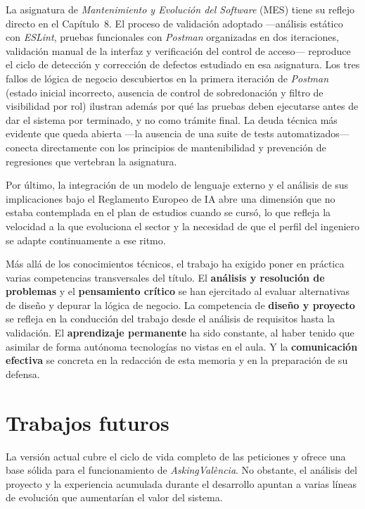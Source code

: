 \documentclass[11pt,oneside,spanish,listoffigures,listoftables]{tfgetsinf}
\begin{document}
La asignatura de \textit{Mantenimiento y Evolución del Software} (MES) tiene su reflejo directo en el Capítulo~8. El proceso de validación adoptado —análisis estático con \textit{ESLint}, pruebas funcionales con \textit{Postman} organizadas en dos iteraciones, validación manual de la interfaz y verificación del control de acceso— reproduce el ciclo de detección y corrección de defectos estudiado en esa asignatura. Los tres fallos de lógica de negocio descubiertos en la primera iteración de \textit{Postman} (estado inicial incorrecto, ausencia de control de sobredonación y filtro de visibilidad por rol) ilustran además por qué las pruebas deben ejecutarse antes de dar el sistema por terminado, y no como trámite final. La deuda técnica más evidente que queda abierta —la ausencia de una suite de tests automatizados— conecta directamente con los principios de mantenibilidad y prevención de regresiones que vertebran la asignatura.

Por último, la integración de un modelo de lenguaje externo y el análisis de sus implicaciones bajo el Reglamento Europeo de IA abre una dimensión que no estaba contemplada en el plan de estudios cuando se cursó, lo que refleja la velocidad a la que evoluciona el sector y la necesidad de que el perfil del ingeniero se adapte continuamente a ese ritmo.

Más allá de los conocimientos técnicos, el trabajo ha exigido poner en práctica varias competencias transversales del título. El \textbf{análisis y resolución de problemas} y el \textbf{pensamiento crítico} se han ejercitado al evaluar alternativas de diseño y depurar la lógica de negocio. La competencia de \textbf{diseño y proyecto} se refleja en la conducción del trabajo desde el análisis de requisitos hasta la validación. El \textbf{aprendizaje permanente} ha sido constante, al haber tenido que asimilar de forma autónoma tecnologías no vistas en el aula. Y la \textbf{comunicación efectiva} se concreta en la redacción de esta memoria y en la preparación de su defensa.

\chapter{Trabajos futuros}

La versión actual cubre el ciclo de vida completo de las peticiones y ofrece una base sólida para el funcionamiento de \textit{AskingValència}. No obstante, el análisis del proyecto y la experiencia acumulada durante el desarrollo apuntan a varias líneas de evolución que aumentarían el valor del sistema.
\end{document}
